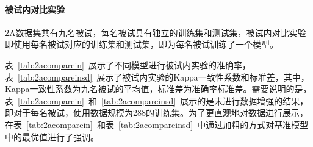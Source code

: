 \paragraph{被试内对比实验}

2A数据集共有九名被试，每名被试具有独立的训练集和测试集，被试内对比实验即使用每名被试对应的训练集和测试集，即为每名被试训练了一个模型。

表~\ref{tab:2acomparein}~展示了不同模型进行被试内实验的准确率，表~\ref{tab:2acompareinsd}~展示了被试内实验的Kappa一致性系数和标准差，其中，Kappa一致性系数为九名被试的平均值，标准差为准确率标准差。需要说明的是，表~\ref{tab:2acomparein}~和~\ref{tab:2acompareinsd}~展示的是未进行数据增强的结果，即对于每名被试，使用数据规模为288的训练集。为了更直观地对数据进行展示，在表~\ref{tab:2acomparein}~和表~\ref{tab:2acompareinsd}~中通过加粗的方式对基准模型中的最优值进行了强调。

